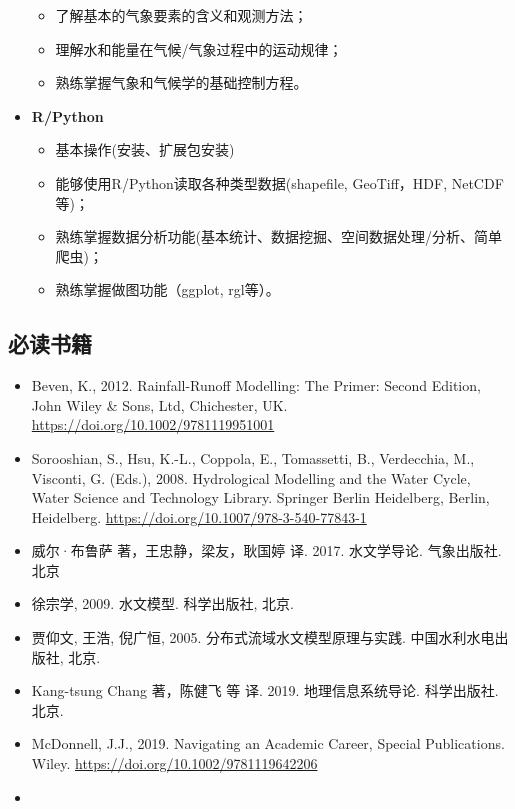 \documentclass[
]{ctexbook}
\providecommand{\tightlist}{%
  \setlength{\itemsep}{0pt}\setlength{\parskip}{0pt}}
\begin{document}
\begin{itemize}
  \begin{itemize}
  \tightlist
  \item
    了解基本的气象要素的含义和观测方法；
  \item
    理解水和能量在气候/气象过程中的运动规律；
  \item
    熟练掌握气象和气候学的基础控制方程。
  \end{itemize}
\item
  \textbf{R/Python}

  \begin{itemize}
  \tightlist
  \item
    基本操作(安装、扩展包安装)
  \item
    能够使用R/Python读取各种类型数据(shapefile, GeoTiff，HDF, NetCDF等)；
  \item
    熟练掌握数据分析功能(基本统计、数据挖掘、空间数据处理/分析、简单爬虫)；
  \item
    熟练掌握做图功能（ggplot, rgl等）。
  \end{itemize}
\end{itemize}

\hypertarget{ux5fc5ux8bfbux4e66ux7c4d}{%
\subsection{必读书籍}\label{ux5fc5ux8bfbux4e66ux7c4d}}

\begin{itemize}
\tightlist
\item
  Beven, K., 2012. Rainfall-Runoff Modelling: The Primer: Second Edition, John Wiley \& Sons, Ltd, Chichester, UK. \url{https://doi.org/10.1002/9781119951001}
\item
  Sorooshian, S., Hsu, K.-L., Coppola, E., Tomassetti, B., Verdecchia, M., Visconti, G. (Eds.), 2008. Hydrological Modelling and the Water Cycle, Water Science and Technology Library. Springer Berlin Heidelberg, Berlin, Heidelberg. \url{https://doi.org/10.1007/978-3-540-77843-1}
\item
  威尔·布鲁萨 著，王忠静，梁友，耿国婷 译. 2017. 水文学导论. 气象出版社. 北京
\item
  徐宗学, 2009. 水文模型. 科学出版社, 北京.
\item
  贾仰文, 王浩, 倪广恒, 2005. 分布式流域水文模型原理与实践. 中国水利水电出版社, 北京.
\item
  Kang-tsung Chang 著，陈健飞 等 译. 2019. 地理信息系统导论. 科学出版社. 北京.
\item
  McDonnell, J.J., 2019. Navigating an Academic Career, Special Publications. Wiley. \url{https://doi.org/10.1002/9781119642206}
\item
\end{itemize}
\end{document}
